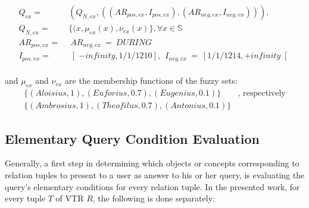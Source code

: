 \documentclass[runningheads,a4paper]{llncs}
\begin{document}
\vspace{-15pt}
\begin{align}
Q_{ex} = &\ (Q_{N,ex}, ((AR_{pos,ex}, I_{pos,ex}), (AR_{neg,ex}, I_{neg,ex}))), \\
Q_{N,ex} = &\ \{(x, \mu_{ex}(x), \nu_{ex}(x)\}, \forall x \in \mathbb{S} \nonumber \\
AR_{pos,ex} = &\ \ AR_{neg,ex}\ =\ DURING \nonumber \\
I_{pos,ex} = &\ \left]- infinity, 1/1/1210\right],\ \ I_{neg,ex}\ =\ \left[1/1/1214, + infinity\right[ \nonumber
\end{align}
\vspace{-10pt}\\
and $\mu_{ex}$ and $\nu_{ex}$ are the membership functions of the fuzzy sets:
\begin{align}
\{(Aloisius, 1), (Euforius, 0.7), (Eugenius, 0.1)\} &\text{, respectively} \nonumber \\
\{(Ambrosius, 1), (Theofilus, 0.7), (Antonius, 0.1)\} & \nonumber
\end{align}
\vspace{-25pt}

\subsection{Elementary Query Condition Evaluation}
Generally, a first step in determining which objects or concepts corresponding to relation tuples to present to a user as answer to his or her query, is evaluating the query's elementary conditions for every relation tuple. In the presented work, for every tuple $T$ of VTR $R$, the following is done separately:
\end{document}
